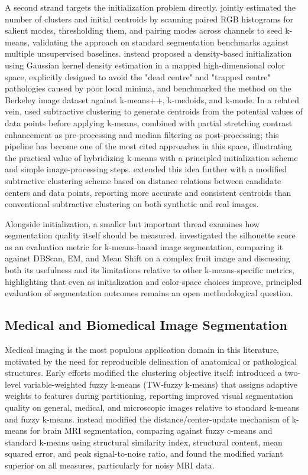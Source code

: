 A second strand targets the initialization problem directly. \cite{basar2020unsupervised} jointly estimated the number of clusters and initial centroids by scanning paired RGB histograms for salient modes, thresholding them, and pairing modes across channels to seed k-means, validating the approach on standard segmentation benchmarks against multiple unsupervised baselines. \cite{kumar2016color} instead proposed a density-based initialization using Gaussian kernel density estimation in a mapped high-dimensional color space, explicitly designed to avoid the "dead centre" and "trapped centre" pathologies caused by poor local minima, and benchmarked the method on the Berkeley image dataset against k-means++, k-medoids, and k-mode. In a related vein, \cite{dhanachandra2015image} used subtractive clustering to generate centroids from the potential values of data points before applying k-means, combined with partial stretching contrast enhancement as pre-processing and median filtering as post-processing; this pipeline has become one of the most cited approaches in this space, illustrating the practical value of hybridizing k-means with a principled initialization scheme and simple image-processing steps. \cite{tongbram2021segmentation} extended this idea further with a modified subtractive clustering scheme based on distance relations between candidate centers and data points, reporting more accurate and consistent centroids than conventional subtractive clustering on both synthetic and real images.

Alongside initialization, a smaller but important thread examines how segmentation quality itself should be measured. \cite{myagmarsuren2024exploring} investigated the silhouette score as an evaluation metric for k-means-based image segmentation, comparing it against DBScan, EM, and Mean Shift on a complex fruit image and discussing both its usefulness and its limitations relative to other k-means-specific metrics, highlighting that even as initialization and color-space choices improve, principled evaluation of segmentation outcomes remains an open methodological question.

\subsection{Medical and Biomedical Image Segmentation}
Medical imaging is the most populous application domain in this literature, motivated by the need for reproducible delineation of anatomical or pathological structures. Early efforts modified the clustering objective itself: \cite{suganya2013image} introduced a two-level variable-weighted fuzzy k-means (TW-fuzzy k-means) that assigns adaptive weights to features during partitioning, reporting improved visual segmentation quality on general, medical, and microscopic images relative to standard k-means and fuzzy k-means. \cite{shrivastava2014medical} instead modified the distance/center-update mechanism of k-means for brain MRI segmentation, comparing against fuzzy c-means and standard k-means using structural similarity index, structural content, mean squared error, and peak signal-to-noise ratio, and found the modified variant superior on all measures, particularly for noisy MRI data.

